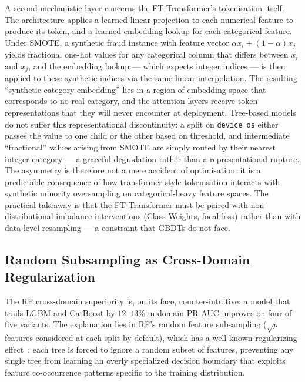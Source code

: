 \documentclass[a4paper,fleqn]{cas-sc}
\begin{document}
A second mechanistic layer concerns the FT-Transformer's tokenisation itself.
The architecture applies a learned linear projection to each numerical feature
to produce its token, and a learned embedding lookup for each categorical
feature.
Under SMOTE, a synthetic fraud instance with feature vector $\alpha x_i + (1-\alpha) x_j$
yields fractional one-hot values for any categorical column that differs between
$x_i$ and $x_j$, and the embedding lookup --- which expects integer indices ---
is then applied to these synthetic indices via the same linear interpolation.
The resulting ``synthetic category embedding'' lies in a region of embedding
space that corresponds to no real category, and the attention layers receive
token representations that they will never encounter at deployment.
Tree-based models do not suffer this representational discontinuity: a split on
\texttt{device\_os} either passes the value to one child or the other based on
threshold, and intermediate ``fractional'' values arising from SMOTE are simply
routed by their nearest integer category --- a graceful degradation rather than
a representational rupture.
The asymmetry is therefore not a mere accident of optimisation: it is a
predictable consequence of how transformer-style tokenisation interacts with
synthetic minority oversampling on categorical-heavy feature spaces.
The practical takeaway is that the FT-Transformer must be paired with
non-distributional imbalance interventions (Class Weights, focal loss) rather
than with data-level resampling --- a constraint that GBDTs do not face.

\subsection{Random Subsampling as Cross-Domain Regularization}
\label{sec:disc_rf}

The RF cross-domain superiority is, on its face, counter-intuitive: a model
that trails LGBM and CatBoost by $12$--$13\%$ in-domain PR-AUC improves on
four of five variants.
The explanation lies in RF's random feature subsampling ($\sqrt{p}$ features
considered at each split by default), which has a well-known regularizing
effect~\citep{breiman2001random}: each tree is forced to ignore a random subset
of features, preventing any single tree from learning an overly specialized
decision boundary that exploits feature co-occurrence patterns specific to the
training distribution.
\end{document}
